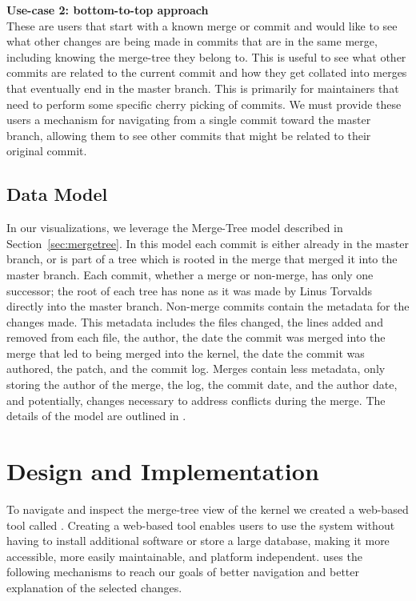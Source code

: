 \documentclass[conference, draftclsnofoot, draft]{IEEEtran}
\begin{document}
\noindent \textbf{Use-case 2: bottom-to-top approach}\label{sec:usecase2}\\
These are users that start with a known merge or commit and would like to see what
other changes are being made in commits that are in the same merge, including
knowing the merge-tree they belong to. This is useful to see what other commits are
related to the current commit and how they get collated into merges that eventually
end in the master branch. This is primarily for maintainers that need to perform
some specific cherry picking of commits. We must provide these users a mechanism for
navigating from a single commit toward the master branch, allowing them to see other
commits that might be related to their original commit.

\subsection{Data Model}

In our visualizations, we leverage the Merge-Tree model described in
Section~\ref{sec:mergetree}. In this model each commit is either already in the
master branch, or is part of a tree which is rooted in the merge that merged it into
the master branch.  Each commit, whether a merge or non-merge, has only one
successor; the root of each tree has none as it was made by Linus Torvalds directly
into the master branch. Non-merge commits contain the metadata for the changes made.
This metadata includes the files changed, the lines added and removed from each
file, the author, the date the commit was merged into the merge that led to being
merged into the kernel, the date the commit was authored, the patch, and the commit
log. Merges contain less metadata, only storing the author of the merge, the log,
the commit date, and the author date, and potentially, changes necessary to address
conflicts during the merge. The details of the model are outlined in
\cite{German2015}.

\section{Design and Implementation}

To navigate and inspect the merge-tree view of the kernel we created a web-based
tool called \tool. Creating a web-based tool enables users to use the system without
having to install additional software or store a large database, making it more
accessible, more easily maintainable, and platform independent. \tool uses the
following mechanisms to reach our goals of better navigation and better explanation
of the selected changes.
\end{document}
